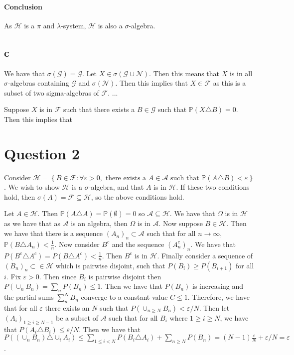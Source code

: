 \documentclass{article}
\theoremstyle{definition}
\numberwithin{theorem}{section}
\numberwithin{equation}{section}
\begin{document}
\paragraph{Conclusion}
As $\mathcal{H}$ is a $\pi$ and $\lambda$-system, $\mathcal{H}$ is also a $\sigma$-algebra. 

\subsection{c}
We have that $\sigma(\mathcal{G}) = \mathcal{G}$. 
Let $X \in \sigma(\mathcal{G} \cup \mathcal{N})$. Then this means that $X$ is in all $\sigma$-algebras containing $\mathcal{G}$ and $\sigma(\mathcal{N})$. Then this implies that $X \in \mathcal{F}$ as this is a subset of two sigma-algebras of $\mathcal{F}$. ...

Suppose $X$ is in $\mathcal{F}$ such that there exists a $B \in \mathcal{G}$ such that $\mathbb{P}(X \triangle B) = 0$. Then this implies that 


\section{Question 2}
Consider $\mathcal{H} = \left\{ B \in \mathcal{F}: \forall \varepsilon > 0, \text{ there exists a } A \in \mathcal{A} \text{ such that } \mathbb{P}(A \triangle B) < \varepsilon \right\}$. We wish to show $\mathcal{H}$ is a $\sigma$-algebra, and that $A$ is in $\mathcal{H}$. If these two conditions hold, then $\sigma(A) = \mathcal{F} \subseteq \mathcal{H}$, so the above conditions hold. 

Let $A \in \mathcal{H}$. Then $\mathbb{P}(A \triangle A) = \mathbb{P}(\emptyset) = 0$ so $\mathcal{A} \subseteq \mathcal{H}$.
We have that $\Omega$ is in $\mathcal{H}$ as we have that as $\mathcal{A}$ is an algebra, then $\Omega$ is in $\mathcal{A}$. Now suppose $B \in \mathcal{H}$. Then we have that there is a sequence $(A_n)_n \subset \mathcal{A}$ such that for all $n \rightarrow \infty$, $\mathbb{P}(B \triangle A_n) < \frac{1}{n}$. 
Now consider $B^c$ and the sequence $(A_n^c)_n$. We have that $P(B^c \triangle A^c) = P(B \triangle A^c) < \frac{1}{n}$. Then $B^c$ is in $\mathcal{H}$. 
Finally consider a sequence of $(B_n)_n \subset \in \mathcal{H}$ which is pairwise disjoint, such that $P(B_i) \geq P(B_{i + 1})$ for all $i$. Fix $\varepsilon > 0$. Then since $B_i$ is pairwise disjoint then $P(\cup_n B_n) = \sum_n P(B_n) \leq 1$. Then we have that $P(B_n)$ is increasing and the partial sums $\sum_n^N B_n$ converge to a constant value $C \leq 1$. Therefore, we have that for all $\varepsilon$ there exists an $N$ such that $P(\cup_{n \geq N}B_n) < \varepsilon/N$. Then let $(A_i)_{1 \geq i \geq N - 1}$ be a subset of $\mathcal{A}$ such that for all $B_i$ where $1 \geq i \geq N$, we have that $P(A_i \triangle B_i) \leq \varepsilon/N$. Then we have that $P((\cup_n B_n) \triangle \cup_i A_i ) \leq \sum_{1 \leq i < N} P(B_i \triangle A_i) + \sum_{n \geq N} P(B_n) = (N-1)\frac{\varepsilon}{N} + \varepsilon/N = \varepsilon$. 
\end{document}
